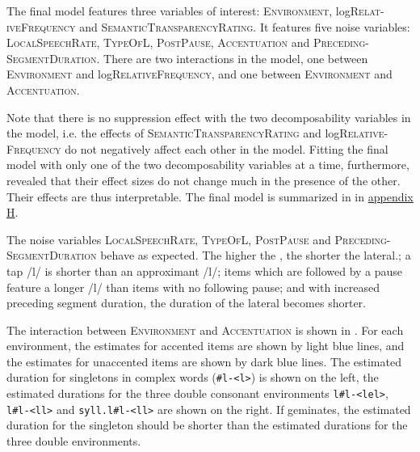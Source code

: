 The final model features three variables of interest: \textsc{Environment}, log\textsc{Relat-iveFrequency} and \textsc{SemanticTransparencyRating}. It features five noise variables: \textsc{LocalSpeechRate}, \textsc{TypeOfL}, \textsc{PostPause}, \textsc{Accentuation} and \textsc{Preceding-SegmentDuration}. 
There are two interactions in the model, one between \textsc{Environment} and log\textsc{RelativeFrequency}, and one between \textsc{Environment} and \textsc{Accentuation}. 

Note that there is no suppression effect with the two decomposability variables in the model, i.e. the effects of  \textsc{SemanticTransparencyRating} and log\textsc{Relative- Frequency} do not negatively affect each other in the model. Fitting the final model with only one of the two decomposability variables at a time, furthermore, revealed that their effect sizes do not change much in the presence of the other. Their effects are thus interpretable.
The final model is summarized in  in \hyperref[Appendix H: Model Summaries Experiment]{appendix H}.

The noise variables \textsc{LocalSpeechRate}, \textsc{TypeOfL}, \textsc{PostPause} and \textsc{Preceding- SegmentDuration} behave as expected. The higher the , the shorter the lateral.; a tap /l/ is shorter than an approximant /l/; items which are followed by a pause feature a longer /l/ than items with no following pause; and with increased preceding segment duration, the duration of the lateral becomes shorter.



The interaction between \textsc{Environment} and \textsc{Accentuation} is shown in . 
For each environment, the estimates for accented items are shown by light blue lines, and the estimates for unaccented items are shown by dark blue lines. The estimated duration for singletons in complex words (\texttt{\#l-<l>}) is shown on the left, the estimated durations for the three double consonant environments \texttt{l\#l-<lel>}, \texttt{l\#l-<ll>} and \texttt{syll.l\#l-<ll>} are shown on the right. If  geminates, the estimated duration for the singleton should be shorter than the estimated durations for the three double environments. 


